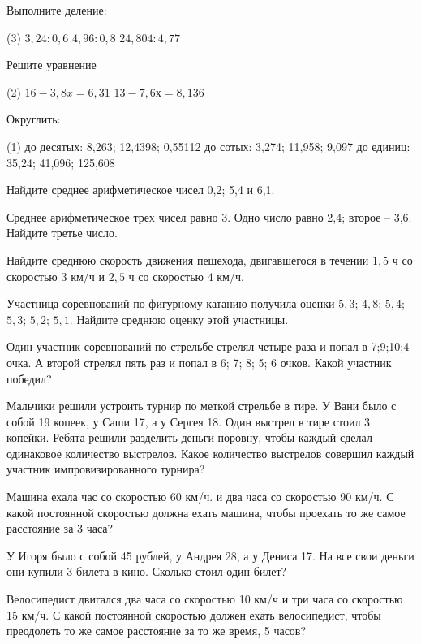 %
%

\begin{class}[number=1]
	\begin{listofex}
		\item Выполните деление:\begin{tasks}(3)
			\task \( 3,24:0,6 \)
			\task \( 4,96 : 0,8 \)
			\task \( 24,804 : 4,77 \)
		\end{tasks}
		\item Решите уравнение \begin{tasks}(2)
			\task \( 16-3,8x = 6,31 \)
			\task \( 13 -7,6х = 8,136 \)
		\end{tasks} 
		\item Округлить:
		\begin{tasks}(1)
			\task до десятых: 8,263;   12,4398;    0,55112
			\task до сотых: 3,274;   11,958;   9,097
			\task до единиц: 35,24;   41,096;   125,608
		\end{tasks} 
		\item Найдите среднее арифметическое чисел 0,2; 5,4 и 6,1.
		\item Среднее арифметическое трех чисел равно 3. Одно число равно 2,4; второе – 3,6. Найдите третье число.
		\item Найдите среднюю скорость движения пешехода, двигавшегося в течении \( 1,5 \) ч со скоростью \( 3 \) км/ч и \( 2,5 \) ч со скоростью \( 4 \) км/ч.
		\item Участница соревнований по фигурному катанию получила оценки \( 5,3 \); \( 4,8 \); \( 5,4 \);\(  5,3 \);  \( 5,2 \); \(  5,1 \). Найдите среднюю оценку этой участницы.                                                                                                                                            
		\item Один участник соревнований по стрельбе стрелял четыре раза и попал в 7;9;10;4 очка. А второй стрелял пять раз и попал в 6; 7; 8; 5; 6 очков. Какой участник победил?    
		\item Мальчики решили устроить турнир по меткой стрельбе в тире. У Вани было с собой 19 копеек, у Саши 17, а у Сергея 18. Один выстрел в тире стоил 3 копейки. Ребята решили разделить деньги поровну, чтобы каждый сделал одинаковое количество выстрелов. Какое количество выстрелов совершил каждый участник импровизированного турнира?
		\item Машина ехала час со скоростью 60 км/ч. и два часа со скоростью 90 км/ч. С какой постоянной скоростью должна ехать машина, чтобы проехать то же самое расстояние за 3 часа? 
		\item У Игоря было с собой   45 рублей, у Андрея   28, а у Дениса   17. На все свои деньги они купили 3 билета в кино. Сколько стоил один билет?  
		\item Велосипедист двигался два часа со скоростью   10 км/ч  и три часа со скоростью   15 км/ч.   С какой постоянной скоростью должен  ехать велосипедист, чтобы преодолеть то же самое расстояние за то же  время, 5 часов?    
	\end{listofex}
\end{class}

